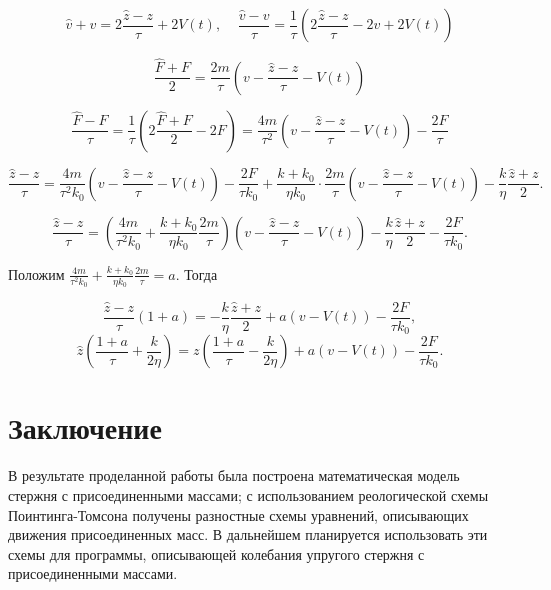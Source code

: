 \documentclass[a4paper,14pt,russian]{extreport}
\numberwithin{figure}{section}
\begin{document}
\begin{equation}
  \hat{v} + v = 2 \frac {\hat{z}-z} { \tau}+2 V(t),\;\;\;\; \frac {\hat{v}-v} {\tau} = \frac {1} {\tau} (2 \frac {\hat{z}-z} {\tau}-2v+2 V(t))
\end{equation}

\begin{equation}
  \frac {\hat{F}+F}{2} = \frac {2m} {\tau} (v- \frac {\hat{z}-z} {\tau} - V(t))
\end{equation}

\begin{equation}
  \frac {\hat{F}-F}{\tau} = \frac {1} {\tau} (2 \frac {\hat{F}+F} {2} - 2F) = \frac {4m} {\tau^2} (v- \frac {\hat{z}-z}{\tau}-V(t))-\frac {2F} {\tau} 
\end{equation}

\begin{equation}
  \frac {\hat{z}-z} {\tau} = \frac {4m} {\tau^2k_0}(v-\frac {\hat{z}-z}{\tau} - V(t))-\frac {2F}{\tau k_0} + \frac {k+k_0} {\eta k_0} \cdot \frac {2m}{\tau}(v-\frac {\hat{z}-z} {\tau}-V(t))-\frac {k} {\eta} \frac{\hat{z}+z}{2}.
\end{equation}

\begin{equation}
  \frac {\hat{z}-z} {\tau} = (\frac {4m}{\tau^2 k_0} + \frac {k+k_0} {\eta k_0} \frac {2m} {\tau})(v-\frac {\hat{z}-z}{\tau}-V(t))-\frac {k} {\eta} \frac {\hat{z}+z}{2} - \frac {2F} {\tau k_0}.
\end{equation}

Положим $\displaystyle \frac {4m} {\tau^2 k_0}+ \frac {k+k_0}{\eta k_0} \frac {2m}{\tau} = a$. Тогда

\begin{equation}
  \frac {\hat{z}-z}{\tau}(1+a)= -\frac {k} {\eta} \frac {\hat{z}+z}{2}+a(v-V(t)) - \frac {2F} {\tau k_0},
\end{equation}
\begin{equation}
  \hat{z}(\frac {1+a}{\tau}+\frac {k}{2\eta})=z(\frac {1+a}{\tau}-\frac {k} {2\eta})+a(v-V(t))-\frac {2F}{\tau k_0}.
\end{equation}



\section{Заключение}
В результате проделанной работы была построена математическая модель стержня с присоединенными массами; с использованием реологической схемы Поинтинга-Томсона получены разностные схемы уравнений, описывающих движения присоединенных масс. В дальнейшем планируется использовать эти схемы для программы,  описывающей колебания упругого стержня с присоединенными массами.




 
\end{document}
